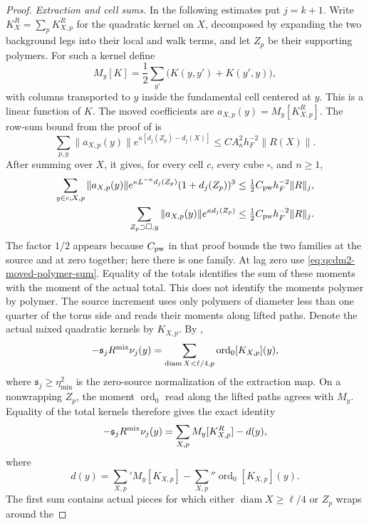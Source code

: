 \documentclass[11pt,letterpaper,reqno]{amsart}
\theoremstyle{definition}
\theoremstyle{remark}
\begin{document}
\begin{proof}
\emph{Extraction and cell sums.}
In the following estimates put $j=k+1$.
Write $K^R_X=\sum_pK^R_{X,p}$ for the quadratic kernel on
$X$, decomposed by expanding the
two background legs into their local and walk terms, and
let $Z_p$ be their supporting polymers. For such a kernel
define
\[
 M_y[K]=\frac12\sum_{y'}\bigl(K(y,y')+K(y',y)\bigr),
\]
with columns transported to $y$ inside the fundamental
cell centered at $y$.  This is a linear function of $K$.
The moved
coefficients are $a_{X,p}(y)=M_y[K^R_{X,p}]$.
The row-sum bound from the proof of
\cite[Prop. 10.1]{QCDM1} is
\[
 \sum_{p,y}\|a_{X,p}(y)\|
 e^{\kappa[d_j(Z_p)-d_j(X)]}
 \le CA_\kappa^2h_F^{-2}\|R(X)\|.
\]
After summing over $X$, it gives, for every cell $c$,
every cube $\square$, and $n\ge1$,
\begin{align}
 \sum_{y\in c,X,p}\|a_{X,p}(y)\|
 e^{\kappa L^{-n}d_j(Z_p)}(1+d_j(Z_p))^3
 &\le\tfrac12C_{\rm pw}h_F^{-2}\|R\|_j,
 \label{eq:qcdm2-moved-cell-sum}\\
 \sum_{Z_p\supset\square,y}\|a_{X,p}(y)\|
 e^{\kappa d_j(Z_p)}
 &\le\tfrac12C_{\rm pw}h_F^{-2}\|R\|_j.
 \label{eq:qcdm2-moved-polymer-sum}
\end{align}
The factor $1/2$ appears because $C_{\rm pw}$ in that proof
bounds the two families at the source and at zero together;
here there is one family. At lag zero use
\eqref{eq:qcdm2-moved-polymer-sum}.
Equality of the totals
identifies the sum of these moments with the moment of
the actual total.  This does not identify the moments
polymer by polymer.  The source increment uses only
polymers of diameter less than one quarter of the torus
side and reads their moments along lifted paths.  Denote
the actual mixed quadratic kernels by $K_{X,p}$.
By \cite[Prop. 10.1, equation (35)]{QCDM1},
\[
 -\mathfrak s_jR^{\rm mix}\nu_j(y)
   =\sum_{\operatorname{diam}X<\ell/4,p}
                  \operatorname{ord}_0[K_{X,p}](y),
\]
where $\mathfrak s_j\ge\eta_{\min}^2$ is the zero-source
normalization of the extraction map.  On a nonwrapping
$Z_p$, the moment $\operatorname{ord}_0$ read along the
lifted paths agrees with $M_y$.
Equality of the total kernels therefore gives the exact
identity
\begin{equation}\label{eq:qcdm2-extraction-discrepancy}
 -\mathfrak s_jR^{\rm mix}\nu_j(y)
       =\sum_{X,p}M_y[K^R_{X,p}]-d(y),
\end{equation}
where
\[
 d(y)=\sum_{X,p}'M_y[K_{X,p}]
                 -\sum_{X,p}''\operatorname{ord}_0[K_{X,p}](y).
\]
The first sum contains actual pieces for which either
$\operatorname{diam}X\ge\ell/4$ or $Z_p$ wraps around the

\end{proof}
\end{document}
